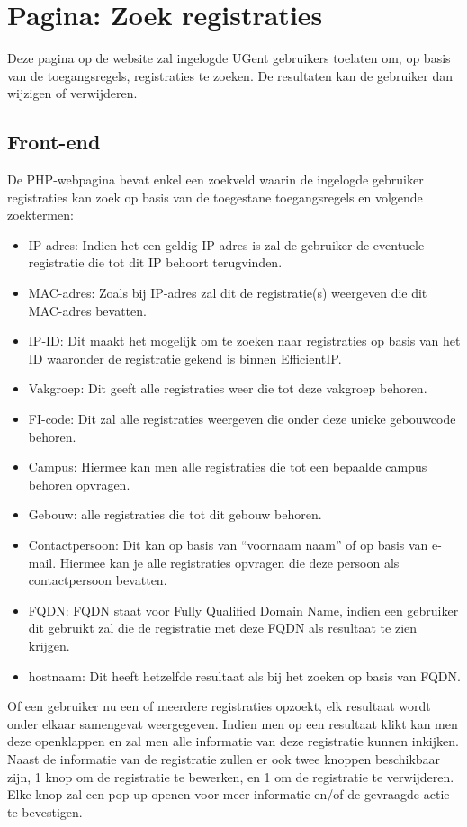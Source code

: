\section{Pagina: Zoek registraties}
\label{zoek-registraties}
Deze pagina op de website zal ingelogde UGent gebruikers toelaten om, op basis van de toegangsregels, registraties te zoeken. De resultaten kan de gebruiker dan wijzigen of verwijderen.
\subsection{Front-end}
De PHP-webpagina bevat enkel een zoekveld waarin de ingelogde gebruiker registraties kan zoek op basis van de toegestane toegangsregels en volgende zoektermen:
\begin{itemize}
    \item IP-adres: Indien het een geldig IP-adres is zal de gebruiker de eventuele registratie die tot dit IP behoort terugvinden.
    \item MAC-adres: Zoals bij IP-adres zal dit de registratie(s) weergeven die dit MAC-adres bevatten.
    \item IP-ID: Dit maakt het mogelijk om te zoeken naar registraties op basis van het ID waaronder de registratie gekend is binnen EfficientIP.
    \item Vakgroep: Dit geeft alle registraties weer die tot deze vakgroep behoren.
    \item FI-code: Dit zal alle registraties weergeven die onder deze unieke gebouwcode behoren.
    \item Campus: Hiermee kan men alle registraties die tot een bepaalde campus behoren opvragen.
    \item Gebouw: alle registraties die tot dit gebouw behoren.
    \item Contactpersoon: Dit kan op basis van “voornaam naam” of op basis van e-mail. Hiermee kan je alle registraties opvragen die deze persoon als contactpersoon bevatten.
    \item FQDN: FQDN staat voor Fully Qualified Domain Name, indien een gebruiker dit gebruikt zal die de registratie met deze FQDN als resultaat te zien krijgen.
    \item hostnaam: Dit heeft hetzelfde resultaat als bij het zoeken op basis van FQDN.
\end{itemize}
Of een gebruiker nu een of meerdere registraties opzoekt, elk resultaat wordt onder elkaar samengevat weergegeven. Indien men op een resultaat klikt kan men deze openklappen en zal men alle informatie van deze registratie kunnen inkijken. Naast de informatie van de registratie zullen er ook twee knoppen beschikbaar zijn, 1 knop om de registratie te bewerken, en 1 om de registratie te verwijderen.
Elke knop zal een pop-up openen voor meer informatie en/of de gevraagde actie te bevestigen.

